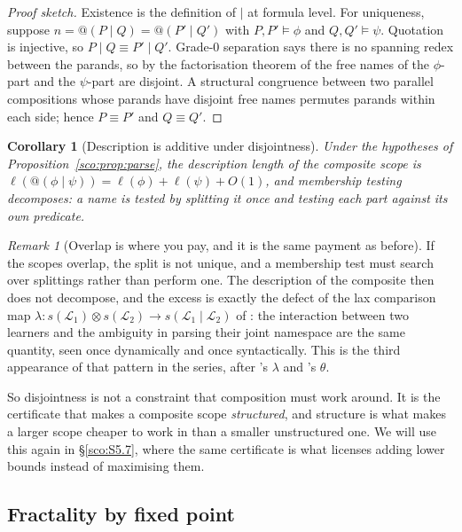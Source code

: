 \documentclass[11pt]{article}
\makeatletter
\theoremstyle{plain}
\newtheorem{corollary}[theorem]{Corollary}
\theoremstyle{definition}
\theoremstyle{remark}
\newtheorem{remark}[theorem]{Remark}
\newcommand{\Lrn}{\mathcal{L}}
\newcommand{\quo}[1]{@#1}
\newcommand{\gen}{\ell}
\makeatother
\begin{document}
\begin{proof}[Proof sketch]
Existence is the definition of $\mid$ at formula level. For uniqueness,
suppose $n = \quo{(P \mid Q)} = \quo{(P' \mid Q')}$ with $P,P' \models
\phi$ and $Q,Q' \models \psi$. Quotation is injective, so
$P \mid Q \equiv P' \mid Q'$. Grade-$0$ separation says there is no
spanning redex between the parands, so by the factorisation theorem of
\cite[\S5]{compose} the free names of the $\phi$-part and the $\psi$-part
are disjoint. A structural congruence between two parallel compositions
whose parands have disjoint free names permutes parands within each side;
hence $P \equiv P'$ and $Q \equiv Q'$.
\end{proof}

\begin{corollary}[Description is additive under disjointness]
\label{sco:cor:additive}
Under the hypotheses of Proposition~\ref{sco:prop:parse}, the description
length of the composite scope is
$\gen(\quo{(\phi \mid \psi)}) = \gen(\phi) + \gen(\psi) + O(1)$,
and membership testing decomposes: a name is tested by splitting it once
and testing each part against its own predicate.
\end{corollary}

\begin{remark}[Overlap is where you pay, and it is the same payment as before]
\label{sco:rem:overlap}
If the scopes overlap, the split is not unique, and a membership test must
search over splittings rather than perform one. The description of the
composite then does not decompose, and the excess is exactly the defect of
the lax comparison map $\lambda \colon s(\Lrn_1) \otimes s(\Lrn_2) \to
s(\Lrn_1 \mid \Lrn_2)$ of \cite[\S5]{compose}: the interaction between two
learners and the ambiguity in parsing their joint namespace are the same
quantity, seen once dynamically and once syntactically. This is the third
appearance of that pattern in the series, after \cite{compose}'s $\lambda$
and \cite{engine}'s $\theta$.
\end{remark}

So disjointness is not a constraint that composition must work around. It
is the certificate that makes a composite scope \emph{structured}, and
structure is what makes a larger scope cheaper to work in than a smaller
unstructured one. We will use this again in \S\ref{sco:S5.7}, where the
same certificate is what licenses adding lower bounds instead of
maximising them.

\subsection{Fractality by fixed point}\label{sco:S3.4}
\end{document}
